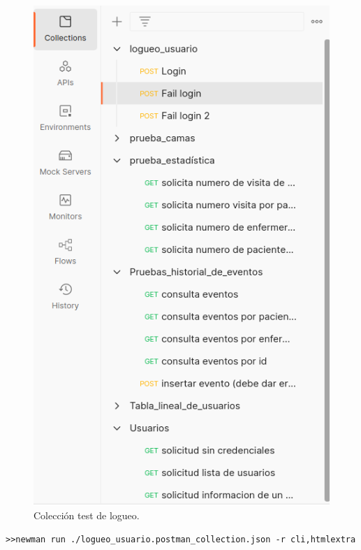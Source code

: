 \begin{figure}[ht]
	\centering
	\includegraphics[scale=.35]{./Figures/Postman.png}
	\caption{Colección test de logueo.}
	\label{fig:Colección logueo usuario en Postman}
\end{figure}

\begin{lstlisting}[label=cod:Newman,caption=  Ejecución de Newman en consola]
>>newman run ./logueo_usuario.postman_collection.json -r cli,htmlextra
\end{lstlisting}

